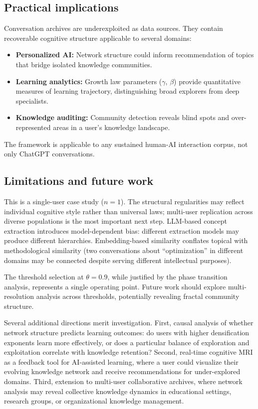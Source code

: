 \documentclass[journal]{IEEEtran}
\begin{document}
\subsection{Practical implications}

Conversation archives are underexploited as data sources.  They contain
recoverable cognitive structure applicable to several domains:
\begin{itemize}
\item \textbf{Personalized AI:} Network structure could inform
  recommendation of topics that bridge isolated knowledge communities.
\item \textbf{Learning analytics:} Growth law parameters ($\gamma$,
  $\beta$) provide quantitative measures of learning trajectory,
  distinguishing broad explorers from deep specialists.
\item \textbf{Knowledge auditing:} Community detection reveals blind
  spots and over-represented areas in a user's knowledge landscape.
\end{itemize}
The framework is applicable to any sustained human-AI interaction corpus,
not only ChatGPT conversations.

\subsection{Limitations and future work}

This is a single-user case study ($n = 1$).  The structural regularities
may reflect individual cognitive style rather than universal laws;
multi-user replication across diverse populations is the most important
next step.  LLM-based concept extraction introduces model-dependent
bias: different extraction models may produce different hierarchies.
Embedding-based similarity conflates topical with methodological
similarity (two conversations about ``optimization'' in different
domains may be connected despite serving different intellectual
purposes).

The threshold selection at $\theta = 0.9$, while justified by the phase
transition analysis, represents a single operating point.  Future work
should explore multi-resolution analysis across thresholds, potentially
revealing fractal community structure.

Several additional directions merit investigation.  First, causal
analysis of whether network structure predicts learning outcomes: do
users with higher densification exponents learn more effectively, or
does a particular balance of exploration and exploitation correlate with
knowledge retention?  Second, real-time cognitive MRI as a feedback
tool for AI-assisted learning, where a user could visualize their
evolving knowledge network and receive recommendations for
under-explored domains.  Third, extension to multi-user collaborative
archives, where network analysis may reveal collective knowledge
dynamics in educational settings, research groups, or organizational
knowledge management.
\end{document}
